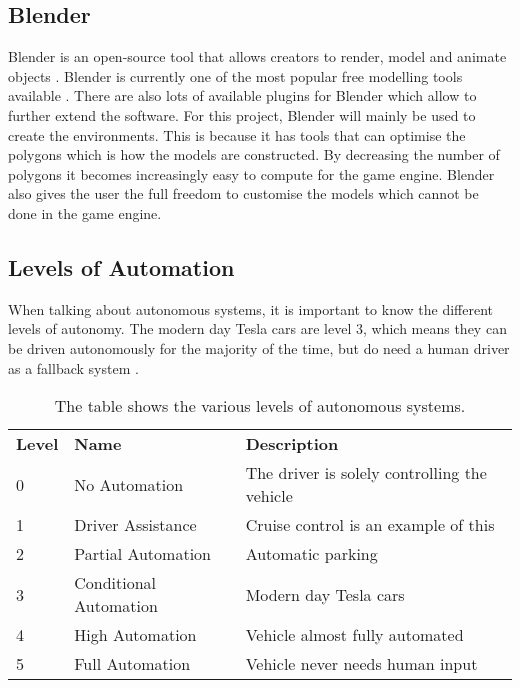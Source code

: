 \subsection{Blender}
Blender is an open-source tool that allows creators to render, model and animate objects \cite{EzraThessMendozaGuevarra2019MaAU}. Blender is currently one of the most popular free modelling tools available \cite{MendozaGuevarraEzraThess2020CGEi}. There are also lots of available plugins for Blender which allow to further extend the software. For this project, Blender will mainly be used to create the environments. This is because it has tools that can optimise the polygons which is how the models are constructed. By decreasing the number of polygons it becomes increasingly easy to compute for the game engine. Blender also gives the user the full freedom to customise the models which cannot be done in the game engine.  

\subsection{Levels of Automation}
When talking about autonomous systems, it is important to know the different levels of autonomy. The modern day Tesla cars are level 3, which means they can be driven autonomously for the majority of the time, but do need a human driver as a fallback system \cite{teslaSelf, Bagloee2016}.
\begin{table}[H]
\begin{tabular}{lll}
\textbf{Level} & \textbf{Name}                   & \textbf{Description} \\
0     & No Automation          & The driver is solely controlling the vehicle\\
1     & Driver Assistance      & Cruise control is an example of this             \\
2     & Partial Automation     & Automatic parking            \\
3     & Conditional Automation & Modern day Tesla cars            \\
4     & High Automation        & Vehicle almost fully automated           \\
5     & Full Automation        & Vehicle never needs human input
\end{tabular}
\caption[Levels of Automation]{The table shows the various levels of autonomous systems.}
\end{table}


